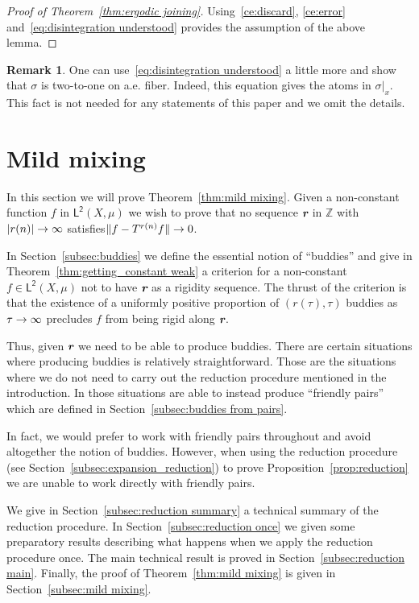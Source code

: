 \documentclass[10pt]{amsart}
\theoremstyle{definition}\newtheorem{defi}[theo]{Definition}\newtheorem{rema}[theo]{Remark}\newtheorem{exam}[theo]{Example}\newtheorem{exem}[theo]{Example}\newtheorem{nota}[theo]{Notation}
\newcommand{\Z}{\mathbb{Z}}
\newcommand{\lp}{\mathsf{L}}
\newcommand{\ltwo}{\lp^{\!\mathsf{2}}}
\def\mathbi#1{\textbf{\em #1}}
\newcommand{\bir}{\mathbi{r}}
\renewcommand*{\to}{\mathchoice{\longrightarrow}{\rightarrow}{\rightarrow}{\rightarrow}}
\begin{document}
\begin{proof}[Proof of Theorem~\ref{thm:ergodic joining}]
Using~\eqref{ce:discard}, \eqref{ce:error} and~\eqref{eq:disintegration understood} provides the assumption of the above lemma.
\end{proof}

\begin{rema}
One can use~\eqref{eq:disintegration understood} a little more and show that $\sigma$ is two-to-one on a.e. fiber. Indeed, this equation gives the atoms in $\sigma|_x$. This fact is not needed for any statements of this paper and we omit the details.
\end{rema}



\section{Mild mixing}\label{sec:mild mixing}

In this section we will prove Theorem~\ref{thm:mild mixing}. Given a non-constant function $f$ in $\ltwo(X,\mu)$ we wish to prove that no sequence $\bir$ in $\Z$ with $|r(n)| \to \infty$ satisfies\linebreak $\| f - T^{r(n)} f \| \to 0$.

In Section~\ref{subsec:buddies} we define the essential notion of ``buddies'' and give in Theorem~\ref{thm:getting_constant weak} a criterion for a non-constant $f \in \ltwo(X,\mu)$ not to have $\bir$ as a rigidity sequence. The thrust of the criterion is that the existence of a uniformly positive proportion of $(r(\tau),\tau)$ buddies as $\tau \to
\infty$ precludes $f$ from being rigid along $\bir$.

Thus, given $\bir$ we need to be able to produce buddies. There are certain situations where producing buddies is relatively straightforward. Those are the situations where we do not need to carry out the reduction procedure mentioned in the introduction. In those situations are able to instead produce ``friendly pairs'' which are defined in Section~\ref{subsec:buddies from pairs}.

In fact, we would prefer to work with friendly pairs throughout and avoid altogether the notion of buddies. However, when using the reduction procedure (see Section~\ref{subsec:expansion_reduction}) to prove Proposition~\ref{prop:reduction} we are unable to work directly with friendly pairs.

We give in Section~\ref{subsec:reduction summary} a technical summary of the reduction procedure. In Section~\ref{subsec:reduction once} we given some preparatory results describing what happens when we apply the reduction procedure once. The main technical result is proved in Section~\ref{subsec:reduction main}. Finally, the proof of Theorem~\ref{thm:mild mixing} is given in Section~\ref{subsec:mild mixing}.
\end{document}
